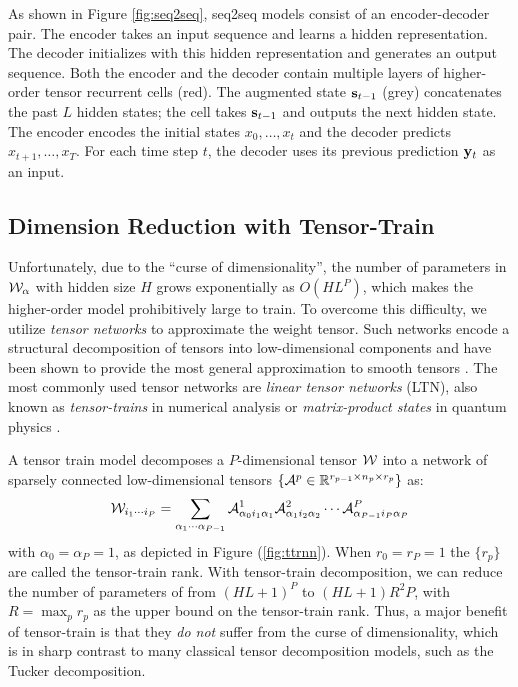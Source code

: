 As shown in Figure \ref{fig:seq2seq}, seq2seq models consist of an encoder-decoder pair. The encoder takes an input sequence and learns a hidden representation. The decoder initializes with this hidden representation and generates an output sequence. Both the encoder and the decoder contain multiple layers of higher-order tensor recurrent cells (red).
% 
The augmented state ${\mathbf{s}}_{t-1}$ (grey) concatenates the past $L$ hidden states;
% 
the \trnn{} cell takes ${\mathbf{s}}_{t-1}$ and outputs the next hidden state. 
% 
The encoder encodes the initial states $x_{0}, \ldots, x_{t}$ and the decoder predicts $x_{t+1}, \ldots, x_{T}$. 
% 
For each time step $t$, the decoder uses its previous prediction ${\mathbf{y}}_t$ as an input.
%
\subsection{Dimension Reduction with Tensor-Train}
% 
Unfortunately, due to the ``curse of dimensionality'', the number of parameters in ${\mathcal{W}}_\alpha$ with hidden size $H$ grows exponentially as $O(HL^P)$, which makes the higher-order model prohibitively large to train. To overcome this difficulty, we  utilize   \textit{tensor networks} to approximate the weight tensor. Such networks encode a structural decomposition of tensors into low-dimensional components and have been shown to provide the most general approximation to smooth tensors \citep{orus2014practical}.
%
The most commonly used tensor networks are \textit{linear tensor networks} (LTN), also known as \textit{tensor-trains} in numerical analysis or \textit{matrix-product states} in quantum physics \citep{oseledets2011tensor}.

A tensor train model decomposes a $P$-dimensional tensor ${\mathcal{W}}$ into a network of sparsely connected low-dimensional tensors $\{{\mathcal{A}}^p \in {\mathbb R}^{r_{p-1} \times n_p \times r_{p}} \}$ as:
%
\begin{equation*}
\T{W}_{i_1 \cdots i_P} =
\sum_{\alpha_1 \cdots \alpha_{P-1}}
\T{A}^1_{\alpha_0 i_1 \alpha_1}%
\T{A}^2_{\alpha_1 i_2 \alpha_2}%
\cdots%
\T{A}^P_{\alpha_{P-1} i_P \alpha_P}
\nonumber
\end{equation*}
%
 with $ \alpha_0 = \alpha_P = 1$, as depicted in Figure (\ref{fig:ttrnn}). When $r_0 = r_{P} = 1$ the $\{r_p\}$ are called the tensor-train rank.
%
With tensor-train decomposition, we can reduce the number of parameters of \trnn{} from $(HL+1)^{P}$ to $(HL+1)R^2P$, with $R = \max_p{r_p}$ as the upper bound on the tensor-train rank.
%
Thus, a major benefit of tensor-train is that they \textit{do not} suffer from the curse of dimensionality, which is in sharp contrast to many classical tensor decomposition models, such as the Tucker decomposition.



